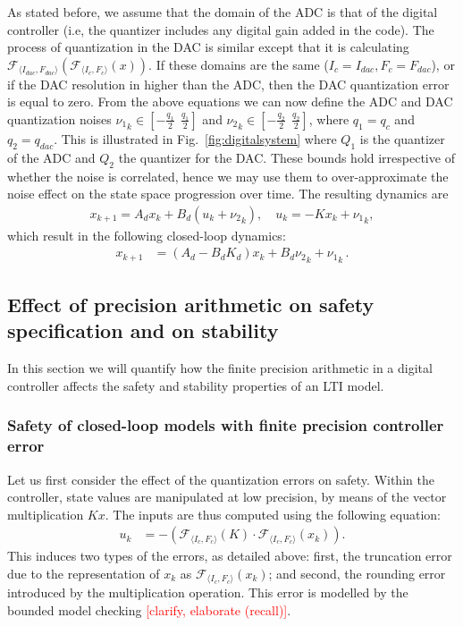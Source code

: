 \documentclass[twocolumn]{autart}    %
\renewcommand{\note}[1]{\textcolor{red}{[#1]}}
\begin{document}
As stated before, we assume that the domain of the
ADC is that of the digital controller (i.e, the quantizer includes any
digital gain added in the code).  The process of quantization in the DAC is
similar except that it is calculating $\mathcal{F}_{\langle I_{dac},F_{dac}
\rangle} (\mathcal{F}_{\langle I_{c},F_{c} \rangle }(x)) $.  If these domains
are the same ($I_{c}=I_{dac},\allowbreak F_{c}=F_{dac}$), or if the DAC
resolution in higher than the ADC, then the DAC quantization error is equal
to zero.  From the above equations we can now define the ADC and DAC
quantization noises ${\nu_1}_k \in [-\frac{q_1}{2}\ \ \frac{q_1}{2}]$ and
${\nu_2}_k \in [-\frac{q_2}{2}\ \ \frac{q_2}{2}]$, where $q_1=q_{c}$ and 
$q_2=q_\mathit{dac}$.  This is illustrated in
Fig.~\ref{fig:digitalsystem} where $Q_1$ is the quantizer of the ADC
and $Q_2$ the quantizer for the DAC.  These bounds hold irrespective of
whether the noise is correlated, hence we may use them to over-approximate
the noise effect on the state space progression over time.  The
resulting dynamics are
%
\begin{align*}
{x}_{k+1} = {A}_d{x}_k+{B}_d({u}_k+{{\nu}_2}_k), \quad u_k = -K{x}_{k}+{{\nu}_1}_k, 
\end{align*}
%
which result in the following closed-loop dynamics:
%
\begin{align*}
{x}_{k+1} &= ({A}_d-{B}_d{K}_d) {x}_k+{B}_d{{\nu}_2}_k +{{\nu}_1}_k \,. 
\end{align*}

\fi


\subsection{Effect of precision arithmetic on safety specification and on stability} 

In this section we will quantify how the finite precision arithmetic in a digital controller affects the
safety and stability properties of an LTI model. 

\subsubsection{Safety of closed-loop models with finite precision controller error} 

Let us first consider the effect of the quantization errors on safety. 
Within the controller, state values are manipulated at low precision,
by means of the vector multiplication $Kx$.
The inputs are thus computed using the following equation: 
%
\begin{align*}
u_{k}&=-(\mathcal{F}_{\langle I_c,F_c \rangle}(K)\cdot\mathcal{F}_{\langle I_c,F_c \rangle}(x_{k})). 
\end{align*}
This induces two types of the errors, 
as detailed above: 
first, the truncation error due to the representation of $x_k$ as $\mathcal{F}_{\langle I_c,F_c
\rangle}(x_{k})$; and second, the rounding error introduced by the multiplication operation. 
This error is modelled by the bounded model checking \note{clarify, elaborate (recall)}.
\end{document}
